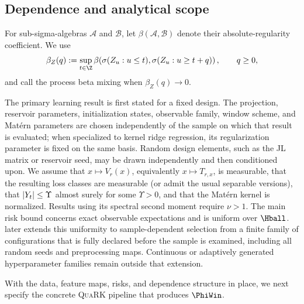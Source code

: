 \subsection{Dependence and analytical scope}
\label{sec:analytical-scope}

For sub-sigma-algebras \(\mathcal A\) and \(\mathcal B\), let
\(\beta(\mathcal A,\mathcal B)\) denote their absolute-regularity coefficient.
We use
\begin{equation}
    \beta_Z(q)
    :=
    \sup_{t\in\Z}
    \beta\!\left(
      \sigma(Z_u:u\leq t),
      \sigma(Z_u:u\geq t+q)
    \right),
    \qquad q\geq0,
    \label{eq:beta-definition}
\end{equation}
and call the process beta mixing when \(\beta_Z(q)\to0\).

The primary learning result is first stated for a fixed design. The
projection, reservoir parameters, initialization states, observable family,
window scheme, and Mat\'ern parameters are chosen independently of the sample
on which that result is evaluated; when specialized to kernel ridge regression,
its regularization parameter is fixed on the same basis. Random design elements,
such as the JL matrix or reservoir seed, may be drawn independently and then
conditioned upon. We assume that \(x\mapsto V_r(x)\), equivalently
\(x\mapsto T_{r,x}\), is measurable, that the resulting loss classes are
measurable (or admit the usual separable versions), that
\(\left| Y_t \right|\leq\Upsilon\) almost surely for some \(\Upsilon>0\), and that the
Mat\'ern kernel is normalized. Results using its spectral second moment require
\(\nu>1\). The main risk bound concerns exact observable expectations and is
uniform over \(\Hball\).  later extends this
uniformity to sample-dependent selection from a finite family of configurations
that is fully declared before the sample is examined, including all random
seeds and preprocessing maps. Continuous or adaptively generated
hyperparameter families remain outside that extension.

With the data, feature maps, risks, and dependence structure in place, we next
specify the concrete \textsc{QuaRK} pipeline that produces \(\PhiWin\).
